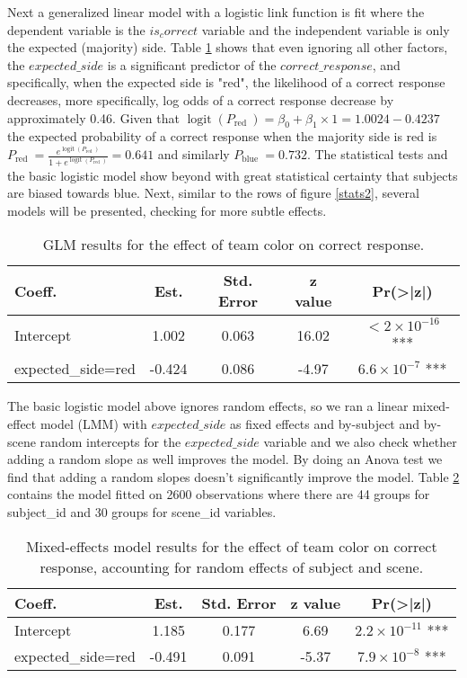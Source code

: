 Next a generalized linear model with a logistic link function is fit where the dependent variable is the $is_correct$ variable and the independent variable is only the expected (majority) side. Table \ref{table:glm_results} shows that even ignoring all other factors, the $expected\_side$ is a significant predictor of the $correct\_response$, and specifically, when the expected side is "red", the likelihood of a correct response decreases, more specifically, log odds of a correct response decrease by approximately 0.46. Given that $\operatorname{logit}\left(P_{\text {red }}\right)=\beta_0+\beta_1 \times 1=1.0024-0.4237$ the expected probability of a correct response when the majority side is red is $P_{\text {red }}=\frac{e^{\operatorname{logit}\left(P_{\text {red }}\right)}}{1+e^{\operatorname{logit}\left(P_{\text {red }}\right)}}=0.641$ and similarly $P_{\text {blue }}=0.732$. The statistical tests and the basic logistic model show beyond with great statistical certainty that subjects are biased towards blue. Next, similar to the rows of figure \ref{stats2}, several models will be presented, checking for more subtle effects.

\begin{table}[h]
    \centering
    \caption{GLM results for the effect of team color on correct response.}
    \begin{tabular}{lcccc}
        \hline
        Coeff. & Est. & Std. Error & z value & Pr(>|z|) \\
        \hline
        Intercept & 1.002 & 0.063 & 16.02 & $< 2 \times 10^{-16}$ *** \\
        expected\_side=red & -0.424 & 0.086 & -4.97 & $6.6 \times 10^{-7}$ *** \\
        \hline
    \end{tabular}
    \label{table:glm_results}
\end{table}

The basic logistic model above ignores random effects, so we ran a linear mixed-effect model (LMM) with $expected\_side$ as fixed effects and by-subject and by-scene random intercepts for the $expected\_side$ variable and we also check whether adding a random slope as well improves the model. By doing an Anova test we find that adding a random slopes doesn't significantly improve the model. Table \ref{table:glmer_results} contains the model fitted on 2600 observations where there are 44 groups for subject\_id and 30 groups for scene\_id variables.

\begin{table}[h]
    \centering
    \caption{Mixed-effects model results for the effect of team color on correct response, accounting for random effects of subject and scene.}
    \begin{tabular}{lcccc}
        \hline
        Coeff. & Est. & Std. Error & z value & Pr(>|z|) \\
        \hline
        Intercept & 1.185 & 0.177 & 6.69 & $2.2 \times 10^{-11}$ *** \\
        expected\_side=red & -0.491 & 0.091 & -5.37 & $7.9 \times 10^{-8}$ *** \\
        \hline
    \end{tabular}
    \label{table:glmer_results}
\end{table}

